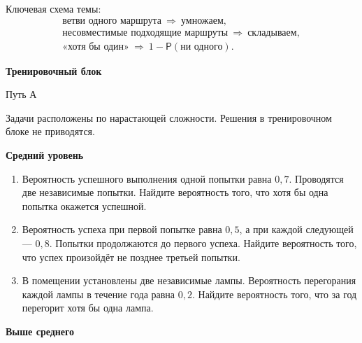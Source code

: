 \documentclass[a4paper,12pt]{article}
\newcommand{\Prob}{\mathsf{P}}
\newcommand{\subtopic}[1]{%
  \vspace{0.4em}
  {\large\bfseries\color{darkaccent}#1\par}
  \vspace{0.15em}
}
\begin{document}
Ключевая схема темы:
\[
\boxed{
\begin{gathered}
\text{ветви одного маршрута}\ \Longrightarrow\ \text{умножаем},\\[2mm]
\text{несовместимые подходящие маршруты}\ \Longrightarrow\ \text{складываем},\\[2mm]
\text{«хотя бы один»}\ \Longrightarrow\
1-\Prob(\text{ни одного}).
\end{gathered}
}
\]


\clearpage

\begin{center}
{\LARGE\bfseries\color{darkaccent}
Тренировочный блок}
\par\vspace{0.3em}
{\large Путь А}
\end{center}

\vspace{0.7em}

Задачи расположены по нарастающей сложности. Решения в тренировочном
блоке не приводятся.

\subtopic{Средний уровень}

\begin{enumerate}[label=\arabic*)]

\item
Вероятность успешного выполнения одной попытки равна $0{,}7$.
Проводятся две независимые попытки.
Найдите вероятность того, что хотя бы одна попытка окажется успешной.

\item
Вероятность успеха при первой попытке равна $0{,}5$, а при каждой
следующей --- $0{,}8$.
Попытки продолжаются до первого успеха.
Найдите вероятность того, что успех произойдёт не позднее третьей попытки.

\item
В помещении установлены две независимые лампы.
Вероятность перегорания каждой лампы в течение года равна $0{,}2$.
Найдите вероятность того, что за год перегорит хотя бы одна лампа.

\end{enumerate}

\subtopic{Выше среднего}
\end{document}
